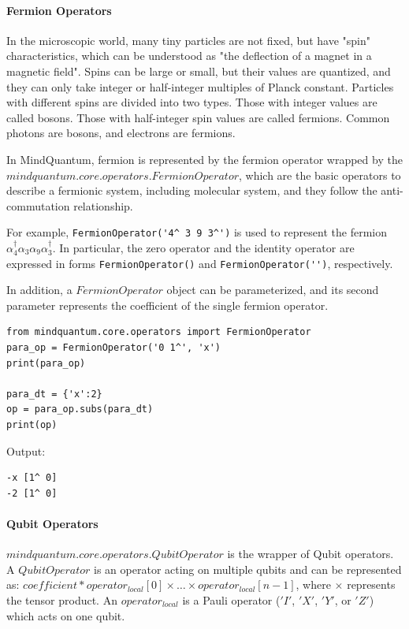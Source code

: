 \paragraph{Fermion Operators}
In the microscopic world, many tiny particles are not fixed, but have "spin" characteristics, which can be understood as "the deflection of a magnet in a magnetic field". Spins can be large or small, but their values are quantized, and they can only take integer or half-integer multiples of Planck constant. Particles with different spins are divided into two types. Those with integer values are called bosons. Those with half-integer spin values are called fermions. Common photons are bosons, and electrons are fermions.

In MindQuantum, fermion is represented by the fermion operator wrapped by the $mindquantum.core.operators.FermionOperator$, which are the basic operators to describe a fermionic system, including molecular system, and they follow the anti-commutation relationship.

For example, \verb|FermionOperator('4^ 3 9 3^')| is used to represent the fermion $\alpha_4^\dagger \alpha_3 \alpha_9 \alpha_3^\dagger$. In particular, the zero operator and the identity operator are expressed in forms \verb|FermionOperator()| and \verb|FermionOperator('')|, respectively.

In addition, a $FermionOperator$ object can be parameterized, and its second parameter represents the coefficient of the single fermion operator.

\begin{lstlisting}
from mindquantum.core.operators import FermionOperator
para_op = FermionOperator('0 1^', 'x')
print(para_op)

para_dt = {'x':2}
op = para_op.subs(para_dt)
print(op)
\end{lstlisting}
Output:
\begin{lstlisting}
-x [1^ 0]
-2 [1^ 0]
\end{lstlisting}

\paragraph{Qubit Operators}
$mindquantum.core.operators.QubitOperator$ is the wrapper of Qubit operators. A $QubitOperator$ is an operator acting on multiple qubits and can be represented as: $coefficient * operator_{local}[0] × … × operator_{local}[n-1]$, where $×$ represents the tensor product. An $operator_{local}$ is a Pauli operator ($'I'$, $'X'$, $'Y'$, or $'Z'$) which acts on one qubit.

